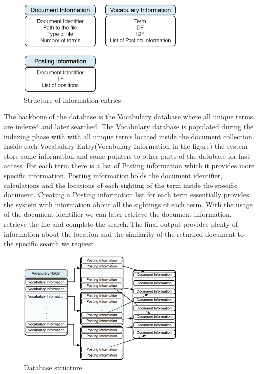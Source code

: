 \documentclass[letterpaper,twocolumn,10pt]{article}
\begin{document}
\begin{figure}[H]
    \centering
    \includegraphics[width=3.2in]{ClassInternals.eps}
    \caption{Structure of information entries}
    \label{Structure of information entries}
\end{figure}

The backbone of the database is the Vocabulary database where all unique terms are indexed and later searched. The Vocabulary database is populated during the indexing phase with with all unique terms located inside the document collection. Inside each Vocabulary Entry(Vocabulary Information in the figure) the system store some information and some pointers to other parts of the database for fast access. For each term there is a list of Posting information which it provides more specific information. Posting information holds the document identifier, calculations and the locations of each sighting of the term inside the specific document. Creating a Posting information list for each term essentially provides the system with information about all the sightings of each term. With the usage of the document identifier we can later retrieve the document information, retrieve the file and complete the search. The final output provides plenty of information about the location and the similarity of the returned document to the specific search we request.

\begin{figure}[H]
    \centering
    \includegraphics[width=3.2in]{DB.eps}
    \caption{Database structure}
    \label{Database structure}
\end{figure}
\end{document}
